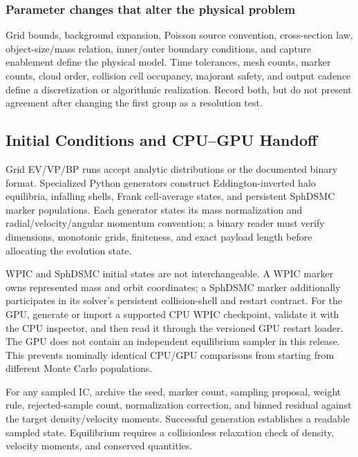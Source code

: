 \subsubsection{Parameter changes that alter the physical problem}

Grid bounds, background expansion, Poisson source convention, cross-section
law, object-size/mass relation, inner/outer boundary conditions, and capture
enablement define the physical model.  Time tolerances, mesh counts, marker
counts, cloud order, collision cell occupancy, majorant safety, and output
cadence define a discretization or algorithmic realization.  Record both, but
do not present agreement after changing the first group as a resolution test.

\subsection{Initial Conditions and CPU--GPU Handoff}
\label{sec:initial-data-shared}

Grid EV/VP/BP runs accept analytic distributions or the documented
 binary format.  Specialized Python generators construct
Eddington-inverted halo equilibria, infalling shells, Frank cell-average
states, and persistent SphDSMC marker populations.  Each generator states its
mass normalization and radial/velocity/angular momentum convention; a binary
reader must verify dimensions, monotonic grids, finiteness, and exact payload
length before allocating the evolution state.

WPIC and SphDSMC initial states are not interchangeable.  A WPIC marker owns
represented mass and orbit coordinates; a SphDSMC marker additionally
participates in its solver's persistent collision-shell and restart contract.
For the GPU, generate or import a supported CPU WPIC checkpoint, validate it
with the CPU inspector, and then read it through the versioned GPU restart
loader.  The GPU does not contain an independent equilibrium sampler in this
release.  This prevents nominally identical CPU/GPU comparisons from starting
from different Monte Carlo populations.

For any sampled IC, archive the seed, marker count, sampling proposal, weight
rule, rejected-sample count, normalization correction, and binned residual
against the target density/velocity moments.  Successful generation establishes a readable sampled state. Equilibrium
requires a collisionless relaxation check of density, velocity moments, and
conserved quantities.

